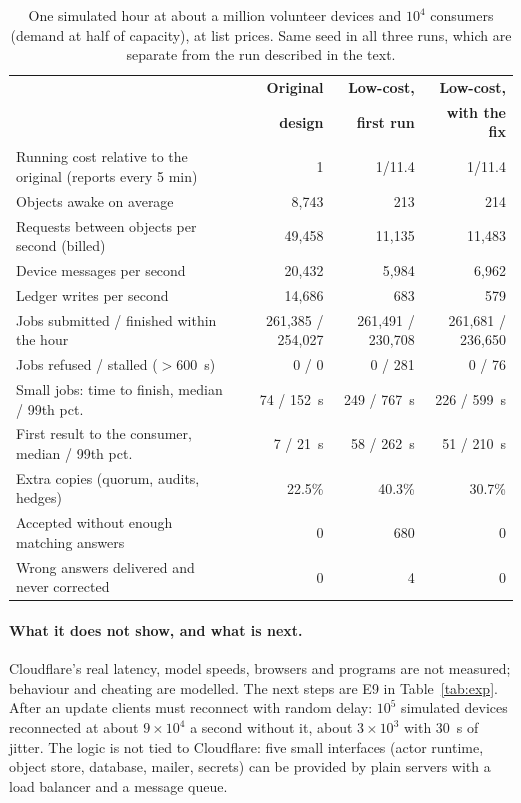 \documentclass[11pt,a4paper]{article}
\theoremstyle{definition}
\theoremstyle{plain}
\begin{document}
\begin{table}[ht]
\centering
\caption{One simulated hour at about a million volunteer devices and $10^4$ consumers (demand at half of
capacity), at list prices. Same seed in all three runs, which are separate from the run described in the
text.}\label{tab:millioncost}
\footnotesize
\begin{tabularx}{\linewidth}{@{}Xrrr@{}}
\toprule
 & \textbf{Original} & \textbf{Low-cost,} & \textbf{Low-cost,} \\
 & \textbf{design} & \textbf{first run} & \textbf{with the fix} \\
\midrule
Running cost relative to the original (reports every 5 min) & 1 & 1/11.4 & 1/11.4 \\
Objects awake on average & 8{,}743 & 213 & 214 \\
Requests between objects per second (billed) & 49{,}458 & 11{,}135 & 11{,}483 \\
Device messages per second & 20{,}432 & 5{,}984 & 6{,}962 \\
Ledger writes per second & 14{,}686 & 683 & 579 \\
Jobs submitted / finished within the hour & 261{,}385 / 254{,}027 & 261{,}491 / 230{,}708 & 261{,}681 / 236{,}650 \\
Jobs refused / stalled ($>600$~s) & 0 / 0 & 0 / 281 & 0 / 76 \\
Small jobs: time to finish, median / 99th pct. & 74 / 152~s & 249 / 767~s & 226 / 599~s \\
First result to the consumer, median / 99th pct. & 7 / 21~s & 58 / 262~s & 51 / 210~s \\
Extra copies (quorum, audits, hedges) & 22.5\% & 40.3\% & 30.7\% \\
Accepted without enough matching answers & 0 & 680 & 0 \\
Wrong answers delivered and never corrected & 0 & 4 & 0 \\
\bottomrule
\end{tabularx}
\end{table}

\paragraph{What it does not show, and what is next.} Cloudflare's real latency, model speeds, browsers and programs are not measured; behaviour and cheating are
modelled. The next steps are E9 in Table~\ref{tab:exp}. After an update clients must reconnect with random delay: $10^5$ simulated
devices reconnected at about $9\times10^4$ a second without it, about $3\times10^3$ with 30~s of jitter. The logic is not tied to Cloudflare: five small interfaces (actor runtime, object store, database, mailer,
secrets) can be provided by plain servers with a load balancer and a message queue.
\end{document}
